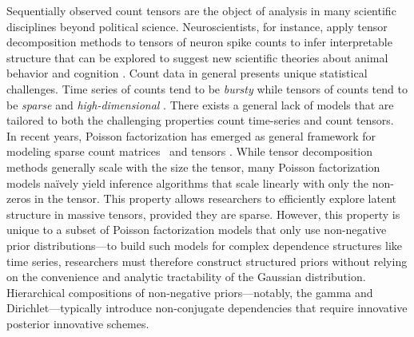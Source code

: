 \documentclass{article}
\begin{document}
Sequentially observed count tensors are the object of analysis in many scientific disciplines beyond political science. Neuroscientists, for instance, apply tensor decomposition methods to tensors of neuron spike counts to infer interpretable structure that can be explored to suggest new scientific theories about animal behavior and cognition \cite{williams2018unsupervised}. Count data in general  presents unique statistical challenges. Time series of counts tend to be \emph{bursty} \cite{kleinberg2003bursty} while tensors of counts tend to be \emph{sparse} and \emph{high-dimensional} \cite{chi2012tensors,kunihama2013bayesian}. There exists a general lack of models that are tailored to both the challenging properties count time-series and count tensors.~
In recent years, Poisson factorization has emerged as general framework for modeling sparse count matrices~\cite{canny2004gap,Dunson2005bayesianlatent,titsias2008infinite,cemgil2009bayesian,zhou2011beta,gopalan2013efficient} and tensors \cite{ermis2014bayesian,schein2015bayesian}. While tensor decomposition methods generally scale with the size the tensor, many Poisson factorization models na\"ively yield inference algorithms that scale linearly with only the non-zeros in the tensor. This property allows researchers to efficiently explore latent structure in massive tensors, provided they are sparse. However, this property is unique to a subset of Poisson factorization models that only use non-negative prior distributions---to build such models for complex dependence structures like time series, researchers must therefore construct structured priors without relying on the convenience and analytic tractability of the Gaussian distribution.  Hierarchical compositions of non-negative priors---notably, the gamma and Dirichlet---typically introduce non-conjugate dependencies that require innovative posterior innovative schemes.
\end{document}
